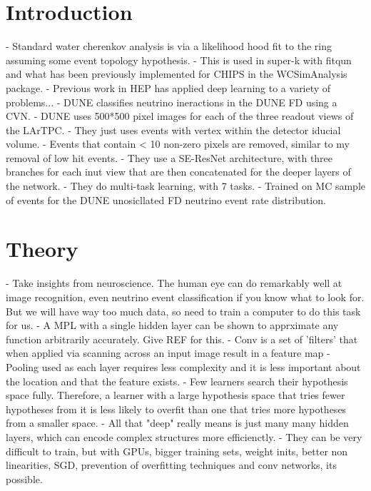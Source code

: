\section{Introduction}
\label{sec:cvn_intro}
- Standard water cherenkov analysis is via a likelihood hood fit to the ring assuming some event topology hypothesis.
- This is used in super-k with fitqun and what has been previously implemented for CHIPS in the WCSimAnalysis package.
- Previous work in HEP has applied deep learning to a variety of problems...
- DUNE classifies neutrino ineractions in the DUNE FD using a CVN.
- DUNE uses 500*500 pixel images for each of the three readout views of the LArTPC.
- They just uses events with vertex within the detector iducial volume.
- Events that contain < 10 non-zero pixels are removed, similar to my removal of low hit events.
- They use a SE-ResNet architecture, with three branches for each inut view that are then concatenated for the deeper layers of the network.
- They do multi-task learning, with 7 tasks.
- Trained on MC sample of events for the DUNE unosicllated FD neutrino event rate distribution.


\section{Theory}
\label{sec:cvn_theory}
- Take insights from neuroscience. The human eye can do remarkably well at image recognition, even neutrino event classification if
you know what to look for. But we will have way too much data, so need to train a computer to do this task for us.
- A MPL with a single hidden layer can be shown to apprximate any function arbitrarily accurately. Give REF for this.
- Conv is a set of 'filters' that when applied via scanning across an input image result in a feature map
- Pooling used as each layer requires less complexity and it is less important about the location and that the feature exists.
- Few learners search their hypothesis space fully. Therefore, a learner with a large hypothesis space that tries fewer hypotheses from it is less likely to overfit than one that tries more hypotheses from a smaller space.
- All that "deep" really means is just many many hidden layers, which can encode complex structures more efficienctly.
- They can be very difficult to train, but with GPUs, bigger training sets, weight inits, better non linearities, SGD, prevention of overfitting techniques and conv networks, its possible.

